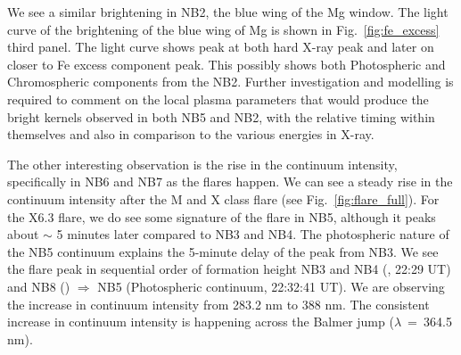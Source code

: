 We see a similar brightening in NB2, the blue wing of the Mg window. The light curve of the brightening of the blue wing of Mg is shown in Fig.~\ref{fig:fe_excess} third panel. The light curve shows peak at both hard X-ray peak and later on closer to Fe excess component peak. This possibly shows both Photospheric and Chromospheric components from the NB2. Further investigation and modelling is required to comment on the local plasma parameters that would produce the bright kernels observed in both NB5 and NB2, with the relative timing within themselves and also in comparison to the various energies in X-ray.

The other interesting observation is the rise in the continuum intensity, specifically in NB6 and NB7 as the flares happen. We can see a steady rise in the continuum intensity after the M and X class flare (see Fig.~\ref{fig:flare_full}). For the X6.3 flare, we do see some signature of the flare in NB5, although it peaks about $\sim$ 5 minutes later compared to NB3 and NB4. The photospheric nature of the NB5 continuum explains the 5-minute delay of the peak from NB3. We see the flare peak in sequential order of formation height NB3 and NB4 (, 22:29 UT) and NB8 () $\Longrightarrow$ NB5 (Photospheric continuum, 22:32:41 UT). We are observing the increase in continuum intensity from 283.2 nm to 388 nm. The consistent increase in continuum intensity is happening across the Balmer jump ($\lambda$~=~364.5 nm).


